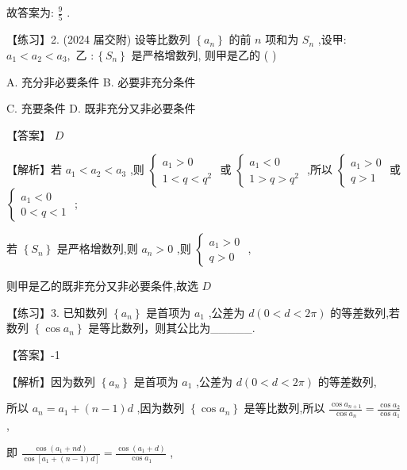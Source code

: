 \documentclass[10pt]{article}
\newcommand*\circled[1]{\tikz[baseline=(char.base)]{\node[shape=circle,draw,inner sep=1.5pt] (char) {\small #1};}}
\begin{document}
故答案为: \(\frac{9}{5}\) .

【练习】2. (2024 届交附) 设等比数列 \(\left\{  {a}_{n}\right\}\) 的前 \(n\) 项和为 \({S}_{n}\) ,设甲: \({a}_{1} < {a}_{2} < {a}_{3},\text{ 乙 } : \left\{  {S}_{n}\right\}\) 是严格增数列, 则甲是乙的 ( )

A. 充分非必要条件 B. 必要非充分条件

C. 充要条件 D. 既非充分又非必要条件

【答案】 \(D\)

【解析】若 \({a}_{1} < {a}_{2} < {a}_{3}\) ,则 \(\left\{  \begin{array}{l} {a}_{1} > 0 \\  1 < q < {q}^{2} \end{array}\right.\) 或 \(\left\{  \begin{array}{l} {a}_{1} < 0 \\  1 > q > {q}^{2} \end{array}\right.\) ,所以 \(\left\{  \begin{array}{l} {a}_{1} > 0 \\  q > 1 \end{array}\right.\) 或 \(\left\{  \begin{array}{l} {a}_{1} < 0 \\  0 < q < 1 \end{array}\right.\) ;

若 \(\left\{  {S}_{n}\right\}\) 是严格增数列,则 \({a}_{n} > 0\) ,则 \(\left\{  \begin{array}{l} {a}_{1} > 0 \\  q > 0 \end{array}\right.\) ,

则甲是乙的既非充分又非必要条件,故选 \(D\)

【练习】3. 已知数列 \(\left\{  {a}_{n}\right\}\) 是首项为 \({a}_{1}\) ,公差为 \(d\left( {0 < d < {2\pi }}\right)\) 的等差数列,若数列 \(\left\{  {\cos {a}_{n}}\right\}\) 是等比数列，则其公比为\_\_\_\_\_.

【答案】-1

【解析】因为数列 \(\left\{  {a}_{n}\right\}\) 是首项为 \({a}_{1}\) ,公差为 \(d\left( {0 < d < {2\pi }}\right)\) 的等差数列,

所以 \({a}_{n} = {a}_{1} + \left( {n - 1}\right) d\) ,因为数列 \(\left\{  {\cos {a}_{n}}\right\}\) 是等比数列,所以 \(\frac{\cos {a}_{n + 1}}{\cos {a}_{n}} = \frac{\cos {a}_{2}}{\cos {a}_{1}}\) ,

即 \(\frac{\cos \left( {{a}_{1} + {nd}}\right) }{\cos \left\lbrack  {{a}_{1} + \left( {n - 1}\right) d}\right\rbrack  } = \frac{\cos \left( {{a}_{1} + d}\right) }{\cos {a}_{1}}\)  \circled{1} ,
\end{document}
